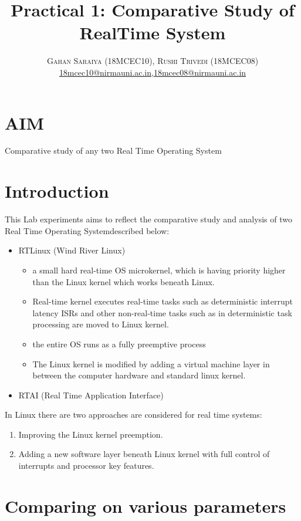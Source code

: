 \documentclass[paper=letter, fontsize=12pt]{article}
\title{\vspace{-15mm}\fontsize{24pt}{10pt}\selectfont\textbf{Practical 1: Comparative Study of RealTime System}} %
\author{
    \large
    {\textsc{Gahan Saraiya (18MCEC10), Rushi Trivedi (18MCEC08) }}\\[2mm]
    \normalsize \href{mailto:18mcec10@nirmauni.ac.in}{18mcec10@nirmauni.ac.in},\href{mailto:18mcec08@nirmauni.ac.in}{18mcec08@nirmauni.ac.in}\\[2mm] %
}
\date{}
\newcommand\rtos{Real Time Operating System}
\newcommand\rtai{Real Time Application Interface}
\begin{document}
    \maketitle %
    \thispagestyle{fancy} %
    
    \section{AIM}
    Comparative study of any two \rtos
    
    \section{Introduction}
    This Lab experiments aims to reflect the comparative study and analysis of two \rtos described below:
    \begin{itemize}
        \item RTLinux (Wind River Linux)
            \begin{itemize}
                \item a small hard real-time OS microkernel, which is having priority higher than the Linux kernel which works beneath Linux.
                \item  Real-time kernel executes real-time tasks such as deterministic interrupt latency ISRs and other non-real-time tasks such as in deterministic task processing are moved to Linux kernel.
                \item the entire OS runs as a fully preemptive process
                \item The Linux kernel is modified by adding a virtual machine layer in between the computer hardware and standard linux kernel.
            \end{itemize}
        \item RTAI (\rtai)
    \end{itemize}
    
    In Linux there are two approaches are considered for real time systems:
    \begin{enumerate}
        \item Improving the Linux kernel preemption.
        \item\label{enum:rtai} Adding a new software layer beneath Linux kernel with full control of interrupts and processor key features.
    \end{enumerate}
    
\section{Comparing on various parameters}
\end{document}
